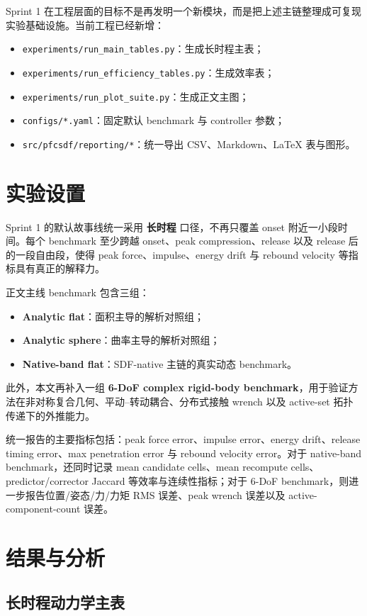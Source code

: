 \documentclass[11pt,a4paper]{ctexart}
\begin{document}
Sprint 1 在工程层面的目标不是再发明一个新模块，而是把上述主链整理成可复现实验基础设施。当前工程已经新增：
\begin{itemize}
    \item \texttt{experiments/run\_main\_tables.py}：生成长时程主表；
    \item \texttt{experiments/run\_efficiency\_tables.py}：生成效率表；
    \item \texttt{experiments/run\_plot\_suite.py}：生成正文主图；
    \item \texttt{configs/*.yaml}：固定默认 benchmark 与 controller 参数；
    \item \texttt{src/pfcsdf/reporting/*}：统一导出 CSV、Markdown、LaTeX 表与图形。
\end{itemize}

\section{实验设置}
Sprint 1 的默认故事线统一采用 \textbf{长时程} 口径，不再只覆盖 onset 附近一小段时间。每个 benchmark 至少跨越 onset、peak compression、release 以及 release 后的一段自由段，使得 peak force、impulse、energy drift 与 rebound velocity 等指标具有真正的解释力。

正文主线 benchmark 包含三组：
\begin{itemize}
    \item \textbf{Analytic flat}：面积主导的解析对照组；
    \item \textbf{Analytic sphere}：曲率主导的解析对照组；
    \item \textbf{Native-band flat}：SDF-native 主链的真实动态 benchmark。
\end{itemize}
此外，本文再补入一组 \textbf{6-DoF complex rigid-body benchmark}，用于验证方法在非对称复合几何、平动--转动耦合、分布式接触 wrench 以及 active-set 拓扑传递下的外推能力。

统一报告的主要指标包括：peak force error、impulse error、energy drift、release timing error、max penetration error 与 rebound velocity error。对于 native-band benchmark，还同时记录 mean candidate cells、mean recompute cells、predictor/corrector Jaccard 等效率与连续性指标；对于 6-DoF benchmark，则进一步报告位置/姿态/力/力矩 RMS 误差、peak wrench 误差以及 active-component-count 误差。

\section{结果与分析}
\subsection{长时程动力学主表}

\end{document}
